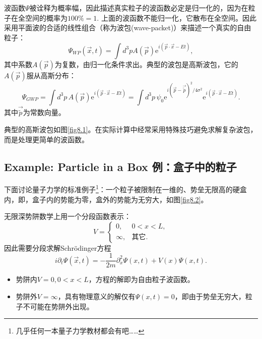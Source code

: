 
波函数$\Psi$被诠释为概率幅，因此描述真实粒子的波函数必定是归一化的，因为在粒子在全空间的概率为$100\% = 1$. 上面的波函数不能归一化，它散布在全空间。因此采用平面波的合适的线性组合（称为波包(wave-packet)）来描述一个真实的自由粒子：
\begin{equation}
\label{equ8.26}
	\Psi_{WP} (\vec{x}, t) = \int d^3 p A(\vec{p}) \mathrm{e}^{i (\vec{p} \cdot \vec{x} - Et)},
\end{equation}
其中系数$A(\vec{p})$为复数，由归一化条件求出。典型的波包是高斯波包，它的$A(\vec{p})$服从高斯分布：
\[
	\Psi_{GWP} = \int d^3 p\, A(\vec{p}) \mathrm{e}^{i (\vec{p} \cdot \vec{x} - Et)} = \int d^3 p\, \psi_0 \mathrm{e}^{i (\vec{p} - \vec{\tilde{p}})^2 / 4\sigma^2} \mathrm{e}^{i (\vec{p} \cdot \vec{x} - Et)}.
\]
其中$\vec{\tilde{p}}$为常数向量。

典型的高斯波包如图\ref{fig8.1}。在实际计算中经常采用特殊技巧避免求解复杂波包，而是处理更简单的波函数。

\subsection[例：盒子中的粒子]{Example: Particle in a Box \quad 例：盒子中的粒子}\label{sec8.5.2}

下面讨论量子力学的标准例子\footnote{几乎任何一本量子力学教材都会有吧……}：一个粒子被限制在一维的、势垒无限高的硬盒内，即，盒子内的势能为零，盒外的势能为无穷大，如图\ref{fig8.2}。

无限深势阱数学上用一个分段函数表示：
\begin{equation}
\label{equ8.27}
	V =
		\begin{cases}
			0, & 0 < x < L, \\
			\infty, & \text{其它}.
		\end{cases}
\end{equation}
因此需要分段求解Schr\"{o}dinger方程
\[
	i \partial_t \Psi(\vec{x}, t) = -\frac{1}{2m} \partial_x^2 \Psi(x, t) + V(x) \Psi(x, t).
\]
\begin{itemize}
	\item 势阱内$V = 0, 0 < x < L$，方程的解即为自由粒子波函数。
	\item 势阱外$V = \infty$，具有物理意义的解仅有$\Psi(x, t) = 0$，即由于势垒无穷大，粒子不可能在势阱外出现。
\end{itemize}

